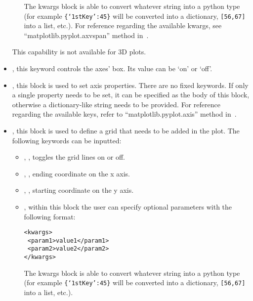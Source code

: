 \begin{itemize}
\begin{itemize}
  The kwargs block is able to convert whatever string into a python type (for
  example \texttt{\{`1stKey':45\}} will
  be converted into a dictionary,
  \texttt{[56,67]} into a list, etc.).
    For reference regarding the available kwargs, see
    ``matplotlib.pyplot.axvspan'' method in~\cite{MatPlotLib}.
  \end{itemize}
  \nb This capability is not available for 3D plots.
  \item {}, this keyword controls the axes' box.
  Its value can be `on' or `off'.
  \item {}, this block is used to set axis properties.
  There are no fixed keywords.
  If only a single property needs to be set, it can be specified as the body of
  this block, otherwise a dictionary-like string needs to be provided.
  For reference regarding the available keys, refer to
  ``matplotlib.pyplot.axis'' method in~\cite{MatPlotLib}.
  \item {}, this block is used to define a grid that needs to be
  added in the plot.
  The following keywords can be inputted:
  \begin{itemize}
    \item {}, , toggles the grid lines on
    or off.
    \item {}, , ending coordinate on the
    x axis.
    \item {}, , starting coordinate on
    the y axis.
    \item {}, within this block the user can specify optional
    parameters with the following format:

\begin{lstlisting}[style=XML]
<kwargs>
 <param1>value1</param1>
 <param2>value2</param2>
</kwargs>
\end{lstlisting}

  The kwargs block is able to convert whatever string into a python type (for
  example \texttt{\{`1stKey':45\}} will
  be converted into a dictionary,
  \texttt{[56,67]} into a list, etc.).
  \end{itemize}
  \vspace{-5mm}
\end{itemize}
